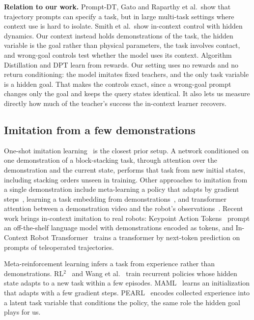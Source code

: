\textbf{Relation to our work.} Prompt-DT, Gato and Raparthy et al.\ show that trajectory prompts can specify a task, but in large
multi-task settings where context use is hard to isolate. Smith et al.\ show in-context control with hidden dynamics. Our context
instead holds demonstrations of the task, the hidden variable is the goal rather than physical parameters, the task involves
contact, and wrong-goal controls test whether the model uses its context. Algorithm Distillation and DPT learn from rewards. Our setting uses
no rewards and no return conditioning: the model imitates fixed teachers, and the only task variable is a hidden goal. That makes
the controls exact, since a wrong-goal prompt changes only the goal and keeps the query states identical. It also lets us measure
directly how much of the teacher's success the in-context learner recovers.

\subsection{Imitation from a few demonstrations}
One-shot imitation learning~\cite{duan2017oneshot} is the closest prior setup. A network conditioned on one demonstration of a
block-stacking task, through attention over the demonstration and the current state, performs that task from new initial states,
including stacking orders unseen in training. Other approaches to imitation from a single demonstration
include meta-learning a policy that adapts by gradient steps~\cite{finn2017oneshot}, learning a task embedding from
demonstrations~\cite{james2018taskembedded}, and transformer attention between a demonstration video and the robot's
observations~\cite{dasari2020transformers}. Recent work brings in-context imitation to real robots: Keypoint Action
Tokens~\cite{dipalo2024keypoint} prompt an off-the-shelf language model with demonstrations encoded as tokens, and In-Context Robot
Transformer~\cite{fu2024incontext} trains a transformer by next-token prediction on prompts of teleoperated trajectories.

Meta-reinforcement learning infers a task from experience rather than demonstrations. RL$^2$~\cite{duan2016rl2} and Wang et
al.~\cite{wang2016learning} train recurrent policies whose hidden state adapts to a new task within a few episodes.
MAML~\cite{finn2017model} learns an initialization that adapts with a few gradient steps. PEARL~\cite{rakelly2019efficient} encodes
collected experience into a latent task variable that conditions the policy, the same role the hidden goal plays for us.

